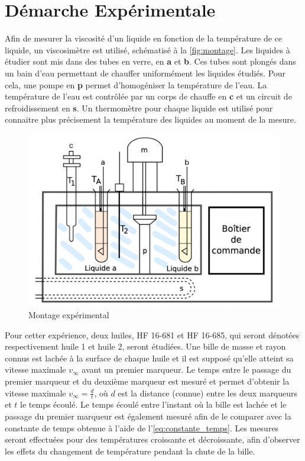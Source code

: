 \section{Démarche Expérimentale}

Afin de mesurer la viscosité d'un liquide en fonction de la température de ce liquide, un viscosimètre est utilisé, schématisé à la \autoref{fig:montage}. Les liquides à étudier sont mis dans des tubes en verre, en \textbf{a} et \textbf{b}. Ces tubes sont plongés dans un bain d'eau permettant de chauffer uniformément les liquides étudiés. Pour cela, une pompe en \textbf{p} permet d'homogéniser la température de l'eau. La température de l'eau est contrôlée par un corps de chauffe en \textbf{c} et un circuit de refroidissement en \textbf{s}. Un thermomètre pour chaque liquide est utilisé pour connaitre plus précisement la température des liquides au moment de la mesure.

\begin{figure}[h]
    \centering
    \includegraphics[width=0.8\linewidth]{figures/montage.png}
    \caption{Montage expérimental \cite{notice}}
    \label{fig:montage}
\end{figure}

Pour cetter expérience, deux huiles, HF 16-681 et HF 16-685, qui seront dénotées respectivement huile 1 et huile 2, seront étudiées. Une bille de masse et rayon connus est lachée à la surface de chaque huile et il est supposé qu'elle atteint sa vitesse maximale \(v_\infty\) avant un premier marqueur. Le temps entre le passage du premier marqueur et du deuxième marqueur est mesuré et permet d'obtenir la vitesse maximale \(v_\infty = \frac{d}{t}\), où \(d\) est la distance (connue) entre les deux marqueurs et \(t\) le temps écoulé. Le temps écoulé entre l'instant où la bille est lachée et le passage du premier marqueur est également mesuré afin de le comparer avec la constante de temps obtenue à l'aide de l'\autoref{eq:constante_temps}. Les mesures seront effectuées pour des températures croissante et décroissante, afin d'observer les effets du changement de température pendant la chute de la bille.
